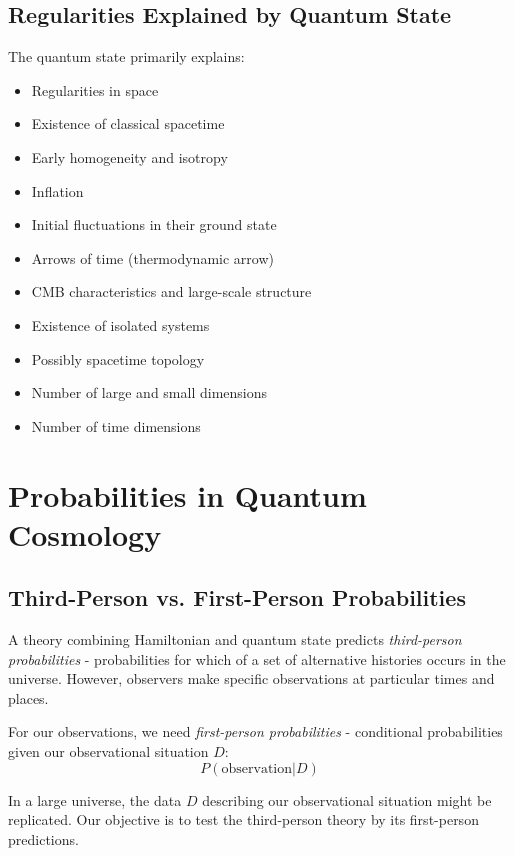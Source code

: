 \documentclass[12pt,a4paper]{article}
\begin{document}
\subsection{Regularities Explained by Quantum State}
The quantum state primarily explains:
\begin{itemize}
    \item Regularities in space
    \item Existence of classical spacetime
    \item Early homogeneity and isotropy
    \item Inflation
    \item Initial fluctuations in their ground state
    \item Arrows of time (thermodynamic arrow)
    \item CMB characteristics and large-scale structure
    \item Existence of isolated systems
    \item Possibly spacetime topology
    \item Number of large and small dimensions
    \item Number of time dimensions
\end{itemize}

\section{Probabilities in Quantum Cosmology}

\subsection{Third-Person vs. First-Person Probabilities}

A theory combining Hamiltonian and quantum state predicts \textit{third-person probabilities} - probabilities for which of a set of alternative histories occurs in the universe. However, observers make specific observations at particular times and places.

For our observations, we need \textit{first-person probabilities} - conditional probabilities given our observational situation $D$:
\begin{equation}
P(\text{observation}|D) 
\end{equation}

In a large universe, the data $D$ describing our observational situation might be replicated. Our objective is to test the third-person theory by its first-person predictions.
\end{document}
